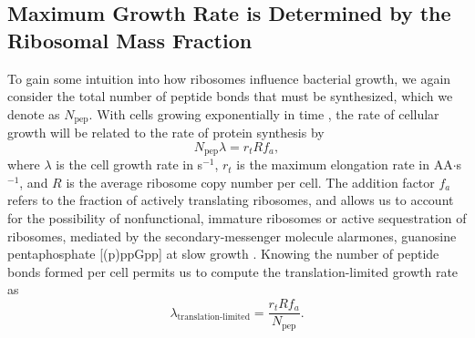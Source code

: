 \subsection{Maximum Growth Rate is Determined by the Ribosomal Mass Fraction}
To gain some intuition into how ribosomes influence
bacterial growth, we again consider the total number of peptide bonds that must
be synthesized, which we denote as $N_\text{pep}$. With cells growing exponentially in time
\citep{godin2010}, the rate of cellular growth will be related to the rate of protein synthesis by
\begin{equation}
    N_\text{pep} \lambda = r_t R f_a,
    \label{eq:mass_balance}
\end{equation}
where $\lambda$ is the cell growth rate in s$^{-1}$, $r_t$ is the maximum
elongation rate in AA$\cdot$s$^{-1}$, and $R$ is the average ribosome copy
number per cell. The addition factor $f_a$ refers to the fraction of actively
translating ribosomes, and allows us to account for the possibility of
nonfunctional, immature ribosomes or active sequestration of ribosomes, mediated
by the secondary-messenger molecule alarmones, guanosine pentaphosphate
[(p)ppGpp] at slow growth \citep{dennis2004, dai2016}. Knowing the number of
peptide bonds formed per cell permits us to compute the translation-limited growth
rate as
\begin{equation}
\lambda_\text{translation-limited} = \frac{r_t R f_a}{N_\text{pep}}.
\label{eq:lambda_limit}
\end{equation}

